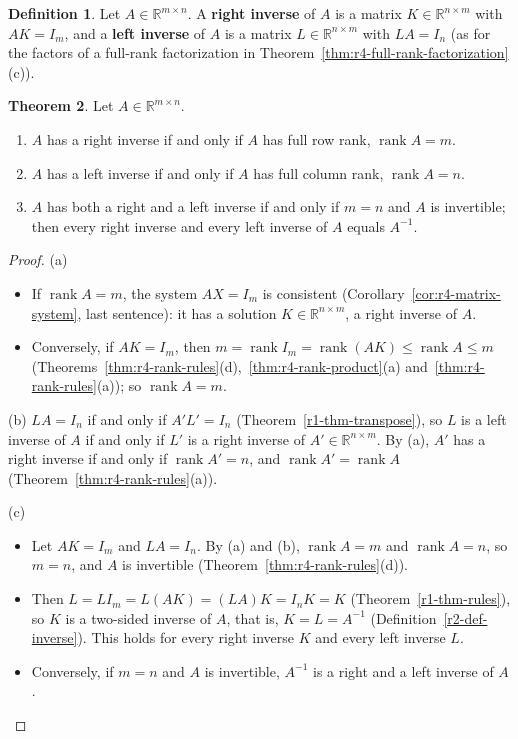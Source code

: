 \documentclass[12pt]{article}
\newcommand{\R}{\mathbb R}
\DeclareMathOperator{\rank}{rank}
\theoremstyle{definition}
\newtheorem{theorem}{Theorem}
\newtheorem{definition}[theorem]{Definition}
\begin{document}
\begin{definition}\label{def:r4-one-sided}
Let \(A\in\R^{m\times n}\). A \textbf{right inverse} of \(A\) is a matrix \(K\in\R^{n\times m}\) with \(AK=I_m\), and a
\textbf{left inverse} of \(A\) is a matrix \(L\in\R^{n\times m}\) with \(LA=I_n\) (as for the factors of a full-rank
factorization in Theorem~\ref{thm:r4-full-rank-factorization}(c)).
\end{definition}

\begin{theorem}\label{thm:r4-one-sided}
Let \(A\in\R^{m\times n}\).
\begin{enumerate}
\item \(A\) has a right inverse if and only if \(A\) has full row rank, \(\rank A=m\).
\item \(A\) has a left inverse if and only if \(A\) has full column rank, \(\rank A=n\).
\item \(A\) has both a right and a left inverse if and only if \(m=n\) and \(A\) is invertible; then every right inverse
and every left inverse of \(A\) equals \(A^{-1}\).
\end{enumerate}
\end{theorem}
\begin{proof}
(a)
\begin{itemize}
\item If \(\rank A=m\), the system \(AX=I_m\) is consistent (Corollary~\ref{cor:r4-matrix-system}, last sentence): it has a
solution \(K\in\R^{n\times m}\), a right inverse of \(A\).
\item Conversely, if \(AK=I_m\), then \(m=\rank I_m=\rank(AK)\leqslant\rank A\leqslant m\)
(Theorems~\ref{thm:r4-rank-rules}(d),~\ref{thm:r4-rank-product}(a) and~\ref{thm:r4-rank-rules}(a)); so \(\rank A=m\).
\end{itemize}
(b) \(LA=I_n\) if and only if \(A'L'=I_n\) (Theorem~\ref{r1-thm-transpose}), so \(L\) is a left inverse of \(A\) if and only
if \(L'\) is a right inverse of \(A'\in\R^{n\times m}\). By (a), \(A'\) has a right inverse if and only if \(\rank A'=n\), and
\(\rank A'=\rank A\) (Theorem~\ref{thm:r4-rank-rules}(a)).

(c)
\begin{itemize}
\item Let \(AK=I_m\) and \(LA=I_n\). By (a) and (b), \(\rank A=m\) and \(\rank A=n\), so \(m=n\), and \(A\) is invertible
(Theorem~\ref{thm:r4-rank-rules}(d)).
\item Then \(L=LI_m=L(AK)=(LA)K=I_nK=K\) (Theorem~\ref{r1-thm-rules}), so \(K\) is a two-sided inverse of \(A\), that is,
\(K=L=A^{-1}\) (Definition~\ref{r2-def-inverse}). This holds for every right inverse \(K\) and every left inverse \(L\).
\item Conversely, if \(m=n\) and \(A\) is invertible, \(A^{-1}\) is a right and a left inverse of \(A\).\qedhere
\end{itemize}
\end{proof}
\end{document}
